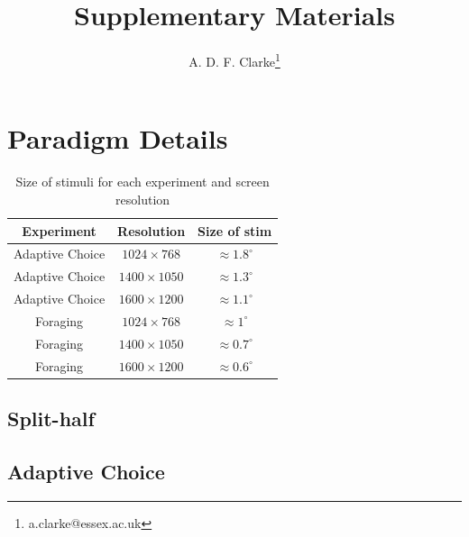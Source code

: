 \documentclass[a4paper, oneside, 11pt, onecolumn]{article}
\begin{document}
\title{Supplementary Materials}

\author{A. D. F. Clarke\thanks{a.clarke@essex.ac.uk}}

\maketitle

\begin{abstract}

\end{abstract}

\section{Paradigm Details}


\begin{table}
	\centering
	\small
	\begin{tabular}{cc|c}
	    Experiment	    &	Resolution	     & Size of stim \\
		\hline
		Adaptive Choice & $1024 \times 768$  & $\approx$$1.8^{\circ}$ \\
		Adaptive Choice & $1400 \times 1050$ & $\approx$$1.3^{\circ}$ \\
		Adaptive Choice & $1600 \times 1200$ & $\approx$$1.1^{\circ}$ \\
		Foraging        & $1024 \times 768$  & $\approx$$1^{\circ}$ \\
		Foraging        & $1400 \times 1050$ & $\approx$$0.7^{\circ}$ \\
		Foraging        & $1600 \times 1200$ & $\approx$$0.6^{\circ}$ \\
	\end{tabular}
	\caption{Size of stimuli for each experiment and screen resolution}
	\label{tab:Screen_Res}
\end{table}

\subsection{Split-half}

\subsection{Adaptive Choice}
\end{document}
